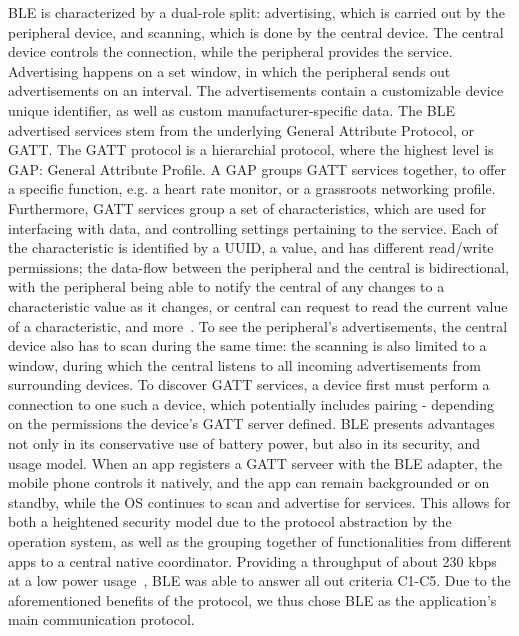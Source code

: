 BLE is characterized by a dual-role split: advertising, which is carried out by the peripheral device, and scanning, which is done by the central device.
The central device controls the connection, while the peripheral provides the service.
Advertising happens on a set window, in which the peripheral sends out advertisements on an interval.
The advertisements contain a customizable device unique identifier, as well as custom manufacturer-specific data.
The BLE advertised services stem from the underlying General Attribute Protocol, or GATT.
The GATT protocol is a hierarchial protocol, where the highest level is GAP: General Attribute Profile. A GAP groups GATT services together, to offer a specific function, e.g. a heart rate monitor, or a grassroots networking profile.
Furthermore, GATT services group a set of characteristics, which are used for interfacing with data, and controlling settings pertaining to the service.
Each of the characteristic is identified by a UUID, a value, and has different read/write permissions; the data-flow between the peripheral and the central is bidirectional, with the peripheral being able to notify the central of any changes to a characteristic value as it changes, or central can request to read the current value of a characteristic, and more~\cite{BLE-guide}.
To see the peripheral's advertisements, the central device also has to scan during the same time: the scanning is also limited to a window, during which the central listens to all incoming advertisements from surrounding devices.
To discover GATT services, a device first must perform a connection to one such a device, which potentially includes pairing - depending on the permissions the device's GATT server defined.   
BLE presents advantages not only in its conservative use of battery power, but also in its security, and usage model. When an app registers a GATT serveer with the BLE adapter, the mobile phone controls it natively, and the app can remain backgrounded or on standby, while the OS continues to scan and advertise for services.
This allows for both a heightened security model due to the protocol abstraction by the operation system, as well as the grouping together of functionalities from different apps to a central native coordinator.
Providing a throughput of about 230 kbps at a low power usage~\cite{Jacopo2017}, BLE was able to answer all out criteria C1-C5.
Due to the aforementioned benefits of the protocol, we thus chose BLE as the application's main communication protocol.
\newcommand{\pmark}{$\sim$}    %

